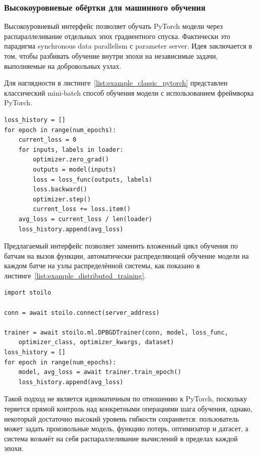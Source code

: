\documentclass[a4paper,12pt]{extarticle}
\begin{document}
\subsubsection{Высокоуровневые обёртки для машинного обучения}

Высокоуровневый интерфейс позволяет обучать PyTorch модели через распараллеливание отдельных эпох градиентного спуска.
Фактически это парадигма synchronous data parallelism с parameter server. Идея заключается в том, чтобы разбивать обучение внутри эпохи на независимые задачи, выполняемые на добровольных узлах.

Для наглядности в листинге~\ref{list:example_classic_pytorch} представлен классический mini-batch способ обучения модели с использованием фреймворка PyTorch.

\begin{lstlisting}[caption={Пример классического mini-batch обучения модели с помощью PyTorch.}, label={list:example_classic_pytorch}]
loss_history = []
for epoch in range(num_epochs):
    current_loss = 0
    for inputs, labels in loader:
        optimizer.zero_grad()
        outputs = model(inputs)
        loss = loss_func(outputs, labels)
        loss.backward()
        optimizer.step()
        current_loss += loss.item()
    avg_loss = current_loss / len(loader)
    loss_history.append(avg_loss)
\end{lstlisting}

Предлагаемый интерфейс позволяет заменить вложенный цикл обучения по батчам на вызов функции, автоматически распределяющей обучение модели на каждом батче на узлы распределённой системы, как показано в листинге~\ref{list:example_distributed_training}.

\begin{lstlisting}[caption={Распределённое обучение модели с использованием STOILO}, label={list:example_distributed_training}]
import stoilo

conn = await stoilo.connect(server_address)

trainer = await stoilo.ml.DPBGDTrainer(conn, model, loss_func,
    optimizer_class, optimizer_kwargs, dataset)
loss_history = []
for epoch in range(num_epochs):
    model, avg_loss = await trainer.train_epoch()
    loss_history.append(avg_loss)
\end{lstlisting}

Такой подход не является идиоматичным по отношению к PyTorch, поскольку теряется прямой контроль над конкретными операциями шага обучения, однако, некоторый достаточно высокий уровень гибкости сохраняется: пользователь может задать произвольные модель, функцию потерь, оптимизатор и датасет, а система возьмёт на себя распараллеливание вычислений в пределах каждой эпохи.
\end{document}
